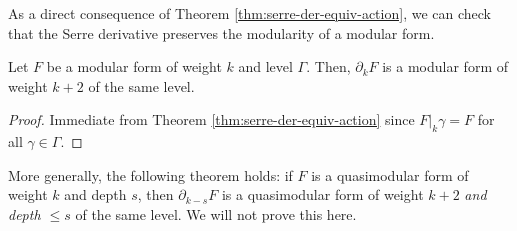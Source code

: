 As a direct consequence of Theorem \ref{thm:serre-der-equiv-action}, we can check that the Serre derivative preserves the modularity of a modular form.
\begin{theorem}\label{thm:serre-der-modularity}\leanok
Let $F$ be a modular form of weight $k$ and level $\Gamma$.
Then, $\partial_{k}F$ is a modular form of weight $k + 2$ of the same level.
\end{theorem}
\begin{proof}
    Immediate from Theorem \ref{thm:serre-der-equiv-action} since $F|_k\gamma = F$ for all $\gamma \in \Gamma$.
\end{proof}

\begin{remark}
More generally, the following theorem holds: if $F$ is a quasimodular form of weight $k$ and depth $s$, then $\partial_{k-s}F$ is a quasimodular form of weight $k + 2$ \emph{and depth $\le s$} of the same level. We will not prove this here.
\end{remark}

